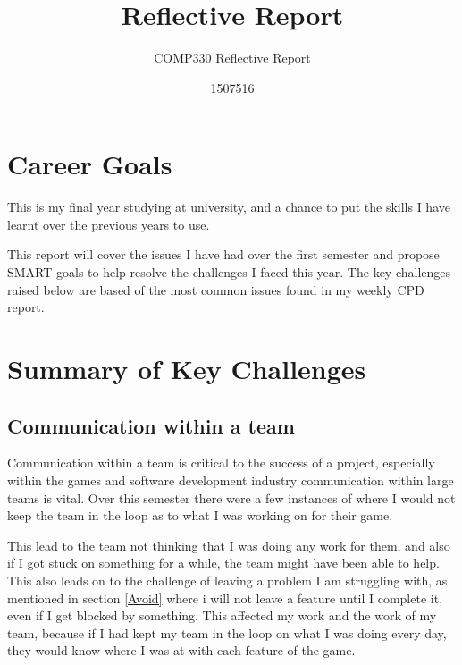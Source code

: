 \documentclass{scrartcl}
\title{Reflective Report}
\subtitle{COMP330 Reflective Report}
\author{1507516}
\begin{document}
\maketitle


\section{Career Goals}
This is my final year studying at university, and a chance to put the skills I have learnt over the previous years to use. 

This report will cover the issues I have had over the first semester and propose SMART goals to help resolve the challenges I faced this year.
The key challenges raised below are based of the most common issues found in my weekly CPD report.


\section{Summary of Key Challenges}


\subsection{Communication within a team} \label{Comm}

Communication within a team is critical to the success of a project, especially within the games and software development industry communication within large teams is vital.
Over this semester there were a few instances of where I would not keep the team in the loop as to what I was working on for their game.

\par

This lead to the team not thinking that I was doing any work for them, and also if I got stuck on something for a while, the team might have been able to help.
This also leads on to the challenge of leaving a problem I am struggling with, as mentioned in section \ref{Avoid} where i will not leave a feature until I complete it, even if I get blocked by something.
This affected my work and the work of my team, because if I had kept my team in the loop on what I was doing every day, they would know where I was at with each feature of the game.
\par
\end{document}
